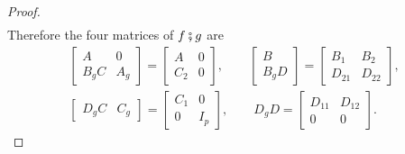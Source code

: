 \documentclass[11pt,a4paper]{article}
\theoremstyle{plain}
\theoremstyle{definition}
\theoremstyle{remark}
\newcommand{\then}{\mathbin{\fatsemi}}
\begin{document}
\begin{proof}
\begin{gather*}
    \end{gather*}
    Therefore the four matrices of $f \then g$ are
    \begin{gather*}
        \begin{bmatrix} A & 0 \\ B_g C & A_g \end{bmatrix} = \begin{bmatrix} A & 0 \\ C_2 & 0 \end{bmatrix},
        \qquad
        \begin{bmatrix} B \\ B_g D \end{bmatrix} = \begin{bmatrix} B_1 & B_2 \\ D_{21} & D_{22} \end{bmatrix}, \\
        \begin{bmatrix} D_g C & C_g \end{bmatrix} = \begin{bmatrix} C_1 & 0 \\ 0 & I_p \end{bmatrix},
        \qquad
        D_g D = \begin{bmatrix} D_{11} & D_{12} \\ 0 & 0 \end{bmatrix} .
    \end{gather*}


\end{proof}
\end{document}
